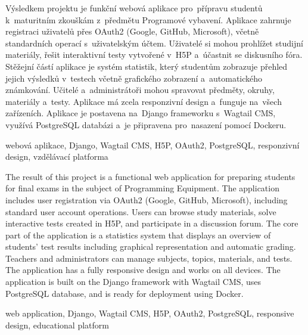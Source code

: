\documentclass[12pt, a4paper,
twoside,
openany
]{report}
\begin{document}
\newpage

	\noindent Výsledkem projektu je funkční webová aplikace pro~přípravu studentů k~maturitním zkouškám z~předmětu Programové vybavení. Aplikace zahrnuje registraci uživatelů přes OAuth2 (Google, GitHub, Microsoft), včetně standardních operací s~uživatelským účtem. Uživatelé si mohou prohlížet studijní materiály, řešit interaktivní testy vytvořené v~H5P a~účastnit se diskusního fóra. Stěžejní částí aplikace je systém statistik, který studentům zobrazuje přehled jejich výsledků v~testech včetně grafického zobrazení a~automatického známkování. Učitelé a~administrátoři mohou spravovat předměty, okruhy, materiály a~testy. Aplikace má zcela responzivní design a~funguje na~všech zařízeních. Aplikace je postavena na~Django frameworku s~Wagtail CMS, využívá PostgreSQL databázi a~je připravena pro~nasazení pomocí Dockeru.
	
	\vspace{18pt}
	
	
	\noindent webová aplikace, Django, Wagtail CMS, H5P, OAuth2, PostgreSQL, responzivní design, vzdělávací platforma
	
	\vspace{18pt}

	
	\noindent The result of this project is a functional web application for preparing students for final exams in the subject of Programming Equipment. The application includes user registration via OAuth2 (Google, GitHub, Microsoft), including standard user account operations. Users can browse study materials, solve interactive tests created in H5P, and participate in a discussion forum. The core part of the application is a statistics system that displays an overview of students' test results including graphical representation and automatic grading. Teachers and administrators can manage subjects, topics, materials, and tests. The application has a fully responsive design and works on all devices. The application is built on the Django framework with Wagtail CMS, uses PostgreSQL database, and is ready for deployment using Docker.
	
	\vspace{18pt}
	
	
	\noindent web application, Django, Wagtail CMS, H5P, OAuth2, PostgreSQL, responsive design, educational platform
	
\end{document}
